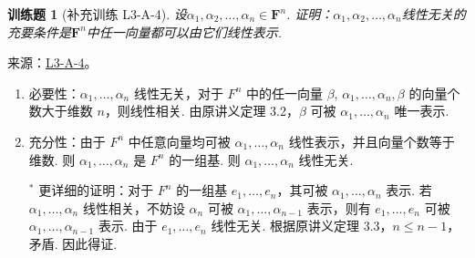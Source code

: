 \documentclass[12pt,fontset=fandol]{ctexart}
\newtheorem{exercise}{训练题}[section]
\begin{document}
\begin{exercise}[补充训练 L3-A-4]\label{prob:L3-A-4}
设$\alpha_1,\alpha_2,\ldots,\alpha_n\in\mathbf{F}^n$. 证明：$\alpha_1,\alpha_2,\ldots,\alpha_n$线性无关的充要条件是$\mathbf{F}^n$中任一向量都可以由它们线性表示.
\end{exercise}
\noindent 来源：\href{https://github.com/yhwu-is/Linear-Algebra-Left-Undone/blob/new/%E8%AE%B2%E4%B9%89/%E4%B8%93%E9%A2%98/3%20%E6%9C%89%E9%99%90%E7%BB%B4%E7%BA%BF%E6%80%A7%E7%A9%BA%E9%97%B4.tex}{L3-A-4}。
\begin{solve}
\begin{enumerate}
                \item 必要性：$\alpha_1,\ldots,\alpha_n$ 线性无关，对于 $F^n$ 中的任一向量 $\beta$, $\alpha_1,\ldots,\alpha_n,\beta$ 的向量个数大于维数 $n$，则线性相关. 由原讲义定理 3.2，$\beta$ 可被 $\alpha_1,\ldots,\alpha_n$ 唯一表示.

                \item 充分性：由于 $F^n$ 中任意向量均可被 $\alpha_1,\ldots,\alpha_n$ 线性表示，并且向量个数等于维数. 则 $\alpha_1,\ldots,\alpha_n$ 是 $F^n$ 的一组基. 则 $\alpha_1,\ldots,\alpha_n$ 线性无关.

                      $^*$ 更详细的证明：对于 $F^n$ 的一组基 $e_1,\ldots,e_n$，其可被 $\alpha_1,\ldots,\alpha_n$ 表示. 若 $\alpha_1,\ldots,\alpha_n$ 线性相关，不妨设 $\alpha_n$ 可被 $\alpha_1,\ldots,\alpha_{n-1}$ 表示，则有 $e_1,\ldots,e_n$ 可被 $\alpha_1,\ldots,\alpha_{n-1}$ 表示. 由于 $e_1,\ldots,e_n$ 线性无关. 根据原讲义定理 3.3，$n\leqslant n-1$，矛盾. 因此得证.
            \end{enumerate}
\end{solve}
\end{document}
